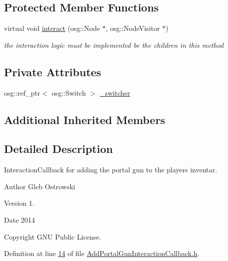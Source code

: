 \subsection*{Protected Member Functions}
\begin{DoxyCompactItemize}
\item 
virtual void \hyperlink{classbrtr_1_1_add_portal_gun_interaction_callback_a9b6571b0295f7e12425b57ff0262dbd4}{interact} (osg\+::\+Node $\ast$, osg\+::\+Node\+Visitor $\ast$)
\begin{DoxyCompactList}\small\item\em the interaction logic must be implemented be the children in this method \end{DoxyCompactList}\end{DoxyCompactItemize}
\subsection*{Private Attributes}
\begin{DoxyCompactItemize}
\item 
osg\+::ref\+\_\+ptr$<$ osg\+::\+Switch $>$ \hyperlink{classbrtr_1_1_add_portal_gun_interaction_callback_ac110a98cbe720e599b344d9940702597}{\+\_\+switcher}
\end{DoxyCompactItemize}
\subsection*{Additional Inherited Members}


\subsection{Detailed Description}
Interaction\+Callback for adding the portal gun to the players inventar. 

\begin{DoxyAuthor}{Author}
Gleb Ostrowski 
\end{DoxyAuthor}
\begin{DoxyVersion}{Version}
1. 
\end{DoxyVersion}
\begin{DoxyDate}{Date}
2014 
\end{DoxyDate}
\begin{DoxyCopyright}{Copyright}
G\+N\+U Public License. 
\end{DoxyCopyright}


Definition at line \hyperlink{_add_portal_gun_interaction_callback_8h_source_l00014}{14} of file \hyperlink{_add_portal_gun_interaction_callback_8h_source}{Add\+Portal\+Gun\+Interaction\+Callback.\+h}.



